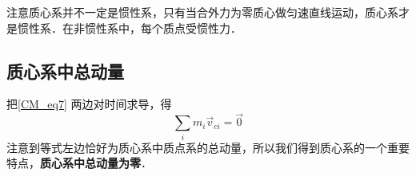 注意质心系并不一定是惯性系，只有当合外力为零质心做匀速直线运动，质心系才是惯性系．在非惯性系中，每个质点受惯性力．

\subsection{质心系中总动量}
把\autoref{CM_eq7} 两边对时间求导，得
\begin{equation}\label{CM_eq8}
\sum_i m_i \vec v_{ci} = \vec 0
\end{equation}
注意到等式左边恰好为质心系中质点系的总动量，所以我们得到质心系的一个重要特点，\textbf{质心系中总动量为零}．


 
